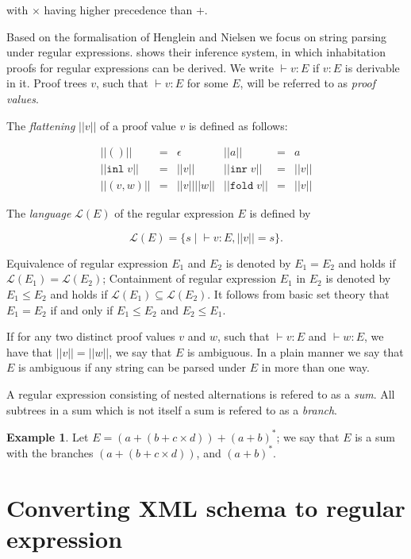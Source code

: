 \documentclass[a4paper, oneside]{memoir}
\let\Fref\undefined
\theoremstyle{definition}
\newtheorem{example}{Example}
\begin{document}
\noindent with $\times$ having higher precedence than $+$.

Based on the formalisation of Henglein and Nielsen \cite{heni2010} we focus on
string parsing under regular expressions. \Fref{fig:inhabitation_proofs}
shows their inference system, in which inhabitation proofs for regular
expressions can be derived. We write $\vdash v : E$ if $v : E$ is derivable in
it. Proof trees $v$, such that $\vdash v : E$ for some $E$, will be referred to
as \emph{proof values}.

The \emph{flattening} $||v||$ of a proof value $v$ is defined as follows:

\[
\begin{array}{rclrcl}
||()|| & = & \epsilon &
||a||  & = & a \\
|| \mathtt{inl} \; v|| & = & ||v|| &
|| \mathtt{inr} \; v|| & = & ||v|| \\
|| (v,w)|| & = & ||v||||w|| &
|| \mathtt{fold} \; v|| & = & ||v||
\end{array}
\]

The \emph{language} $\mathcal{L}(E)$ of the regular expression $E$ is defined by

\[
\mathcal{L}(E) = \{ s \; | \; \vdash v : E, ||v|| = s \}.
\]

Equivalence of regular expression $E_1$ and $E_2$ is denoted by $E_1 = E_2$ and
holds if $\mathcal{L}(E_1) = \mathcal{L}(E_2)$; Containment of regular
expression $E_1$ in $E_2$ is denoted by $E_1 \le E_2$ and holds if
$\mathcal{L}(E_1) \subseteq \mathcal{L}(E_2)$.  It follows from basic set theory
that $E_1 = E_2$ if and only if $E_1 \le E_2$ and $E_2 \le E_1$.

If for any two distinct proof values $v$ and $w$, such that $\vdash v : E$ and
$\vdash w : E$, we have that $||v|| = ||w||$, we say that $E$ is ambiguous. In a
plain manner we say that $E$ is ambiguous if any string can be parsed under $E$
in more than one way.

A regular expression consisting of nested alternations is refered to as a \emph{sum}.
All subtrees in a sum which is not itself a sum is refered to as a \emph{branch}.

\begin{example}
Let $E = (a + (b + c \times d)) + (a + b)^{*}$; we say that $E$ is a sum with
the branches $(a + (b + c \times d))$, and $(a + b)^{\ast}$.
\end{example}

\section{Converting XML schema to regular expression}
\label{sec:convert}
\end{document}
